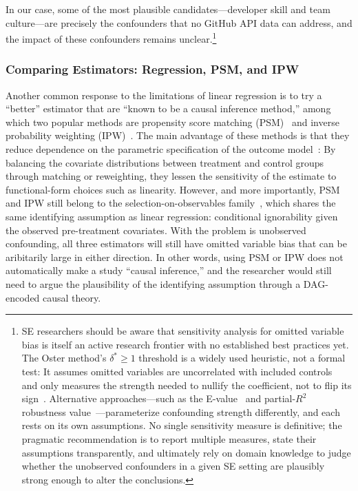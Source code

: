In our case, some of the most plausible candidates---developer skill and team culture---are precisely the confounders that no GitHub API data can address, and the impact of these confounders remains unclear.\footnote{SE researchers should be aware that sensitivity analysis for omitted variable bias is itself an active research frontier with no established best practices yet.
The Oster method's $\delta^* \geq 1$ threshold is a widely used heuristic, not a formal test: It assumes omitted variables are uncorrelated with included controls~\cite{diegert2026endogenous} and only measures the strength needed to nullify the coefficient, not to flip its sign~\cite{masten2025sign}.
Alternative approaches---such as the E-value~\cite{vanderweele2017sensitivity} and partial-$R^2$ robustness value~\cite{cinelli2020making}---parameterize confounding strength differently, and each rests on its own assumptions.
No single sensitivity measure is definitive; the pragmatic recommendation is to report multiple measures, state their assumptions transparently, and ultimately rely on domain knowledge to judge whether the unobserved confounders in a given SE setting are plausibly strong enough to alter the conclusions.}

\subsubsection{Comparing Estimators: Regression, PSM, and IPW}
\label{sec:estimator-convergence}

Another common response to the limitations of linear regression is to try a ``better'' estimator that are ``known to be a causal inference method,'' among which two popular methods are propensity score matching (PSM)~\cite{rosenbaum1983central} and inverse probability weighting (IPW)~\cite{horvitz1952generalization}.
The main advantage of these methods is that they reduce dependence on the parametric specification of the outcome model~\cite{ho2007matching}: By balancing the covariate distributions between treatment and control groups through matching or reweighting, they lessen the sensitivity of the estimate to functional-form choices such as linearity.
However, and more importantly, PSM and IPW still belong to the selection-on-observables family~\cite{imbens2009recent}, which shares the same identifying assumption as linear regression: conditional ignorability given the observed pre-treatment covariates.
With the problem is unobserved confounding, all three estimators will still have omitted variable bias that can be aribitarily large in either direction.
In other words, using PSM or IPW does not automatically make a study ``causal inference,'' and the researcher would still need to argue the plausibility of the identifying assumption through a DAG-encoded causal theory.

